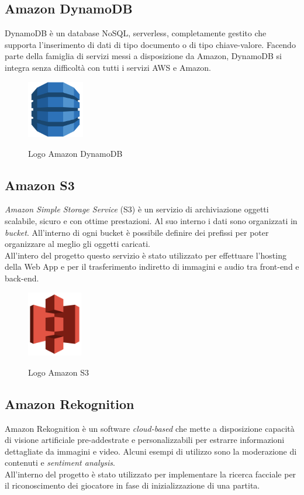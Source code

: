	\subsection{Amazon DynamoDB}
	DynamoDB è un database \gls{NoSQL}, serverless, completamente gestito che supporta l'inserimento di dati di tipo documento o di tipo chiave-valore. Facendo parte della famiglia di servizi messi a disposizione da Amazon, DynamoDB si integra senza
	difficoltà con tutti i servizi \gls{AWS} e Amazon.
	
	\begin{figure}[H]
		\centering
		\includegraphics[width=2.5cm]{immagini/DynamoDB.png} \\
		\caption{\label{fig:logo_dynamoDB} Logo Amazon DynamoDB}
	\end{figure}
	
	\subsection{Amazon S3}
	\emph{Amazon Simple Storage Service} (S3) è un servizio di archiviazione oggetti scalabile, sicuro e con ottime prestazioni. Al suo interno i dati sono organizzati in \emph{bucket}. All'interno di ogni bucket è possibile definire dei prefissi per poter organizzare al meglio gli oggetti caricati. \\
	All'intero del progetto questo servizio è stato utilizzato per effettuare l’hosting della Web App e per il trasferimento indiretto di immagini e audio tra front-end e back-end.
	
	\begin{figure}[H]
		\centering
		\includegraphics[width=2.4cm]{immagini/amazon-s3.png} \\
		\caption{\label{fig:logo_s3} Logo Amazon S3}
	\end{figure}

	
	\subsection{Amazon Rekognition}
	Amazon Rekognition è un software \emph{cloud-based} che mette a disposizione capacità di visione artificiale pre-addestrate e personalizzabili per estrarre informazioni dettagliate da immagini e video. Alcuni esempi di utilizzo sono la moderazione di contenuti e \emph{sentiment analysis}.\\ 
	All'interno del progetto è stato utilizzato per implementare la ricerca facciale per il riconoscimento dei giocatore in fase di inizializzazione di una partita.
	
